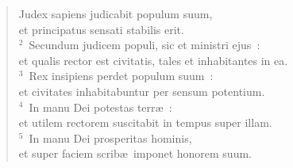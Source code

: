 \begin{flushleft}\begin{verse}\vspace{-19pt}\hspace{6pt}Judex sapiens judicabit populum suum,\\\hspace{6pt} et principatus sensati stabilis erit.\\
${}^{2}$~Secundum judicem populi, sic et ministri ejus~:\\ et qualis rector est civitatis, tales et inhabitantes in ea.\\
${}^{3}$~Rex insipiens perdet populum suum~:\\ et civitates inhabitabuntur per sensum potentium.\\
${}^{4}$~In manu Dei potestas terr\ae~:\\ et utilem rectorem suscitabit in tempus super illam.\\
${}^{5}$~In manu Dei prosperitas hominis,\\ et super faciem scrib\ae\ imponet honorem suum.\end{verse}\end{flushleft}



